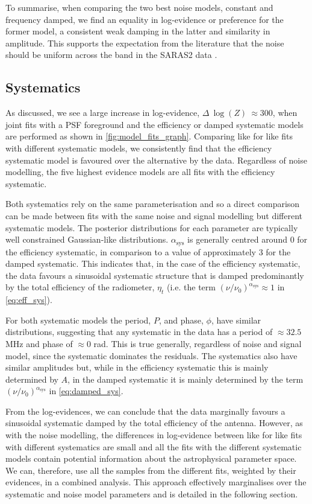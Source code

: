 To summarise, when comparing the two best noise models, constant and frequency damped, we find an equality in log-evidence or preference for the former model, a consistent weak damping in the latter and similarity in amplitude. This supports the expectation from the literature that the noise should be uniform across the band in the SARAS2 data \citep{Singh_saras2_2017,Singh_saras2_2018}.

\subsection{Systematics}

As discussed, we see a large increase in log-evidence, $\Delta~\log(Z)~\approx 300$, when joint fits with a PSF foreground and the efficiency or damped systematic models are performed as shown in \cref{fig:model_fits_graph}. Comparing like for like fits with different systematic models, we consistently find that the efficiency systematic model is favoured over the alternative by the data. Regardless of noise modelling, the five highest evidence models are all fits with the efficiency systematic.

Both systematics rely on the same parameterisation and so a direct comparison can be made between fits with the same noise and signal modelling but different systematic models. The posterior distributions for each parameter are typically well constrained Gaussian-like distributions. $\alpha_\mathrm{sys}$ is generally centred around 0 for the efficiency systematic, in comparison to a value of approximately 3 for the damped systematic. This indicates that, in the case of the efficiency systematic, the data favours a sinusoidal systematic structure that is damped predominantly by the total efficiency of the radiometer, $\eta_t$ (i.e. the term $(\nu / \nu_0)^{\alpha_\mathrm{sys}} \approx 1$ in \cref{eq:eff_sys}).

For both systematic models the period, $P$, and phase, $\phi$, have similar distributions, suggesting that any systematic in the data has a period of $\approx32.5$ MHz and phase of $\approx0$ rad. This is true generally, regardless of noise and signal model, since the systematic dominates the residuals. The systematics also have similar amplitudes but, while in the efficiency systematic this is mainly determined by $A$, in the damped systematic it is mainly determined by the term $(\nu / \nu_0)^{\alpha_\mathrm{sys}}$ in \cref{eq:damped_sys}.

From the log-evidences, we can conclude that the data marginally favours a sinusoidal systematic damped by the total efficiency of the antenna. However, as with the noise modelling, the differences in log-evidence between like for like fits with different systematics are small and all the fits with the different systematic models contain potential information about the astrophysical parameter space. We can, therefore, use all the samples from the different fits, weighted by their evidences, in a combined analysis. This approach effectively marginalises over the systematic and noise model parameters and is detailed in the following section.

